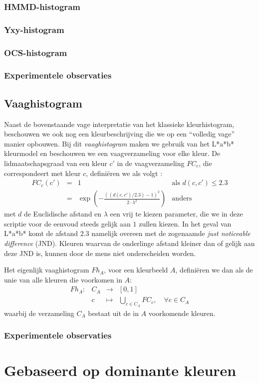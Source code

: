 \subsubsection{HMMD-histogram}

\subsubsection{Yxy-histogram}

\subsubsection{OCS-histogram}

\subsubsection{Experimentele observaties}


\subsection{Vaaghistogram}

Naast de bovenstaande vage interpretatie van het klassieke kleurhistogram, beschouwen we
ook nog een kleurbeschrijving die we op een ``volledig vage'' manier opbouwen. Bij dit
\emph{vaaghistogram} maken we gebruik van het L*a*b* kleurmodel en beschouwen we een 
vaagverzameling voor elke kleur. 
De lidmaatschapsgraad van een kleur $c'$ in de vaagverzameling 
$FC_c$, die correspondeert met kleur $c$, defini\"eren we als volgt \cite{vertan:fuzzy_histograms}: 
$$
\begin{array}{rcll}
FC_c(c') & = & 1 & \textrm{als } d(c,c') \leq 2.3 \\
		 & = & \exp \left( - \frac{\left((d(c,c') / 2.3) - 1\right)^2}{2 \cdot \lambda^2} \right) & \textrm{anders}
\end{array}
$$  
met $d$ de Euclidische afstand en $\lambda$ een vrij te kiezen parameter, die we in deze scriptie
voor de eenvoud steeds gelijk aan $1$ zullen kiezen. In het geval van L*a*b* 
komt de afstand $2.3$ namelijk overeen met de zogenaamde \emph{just noticeable difference} (JND). 
Kleuren waarvan de onderlinge afstand kleiner dan of gelijk aan deze JND is, kunnen door de mens 
niet onderscheiden worden.

Het eigenlijk vaaghistogram $Fh_A$, voor een kleurbeeld $A$, defini\"eren we dan als de unie van 
alle kleuren die voorkomen in $A$:
$$
\begin{array}{lrcl}
Fh_A: 	& C_A 	& \to 		& [0,1] \\[5pt]
		& c					& \mapsto	& \displaystyle\bigcup_{c \in C_A} FC_c,
\quad\forall c \in C_A
\end{array}
$$ 
waarbij de verzameling $C_A$ bestaat uit de in $A$ voorkomende kleuren.

\subsubsection{Experimentele observaties}


\section{Gebaseerd op dominante kleuren}
